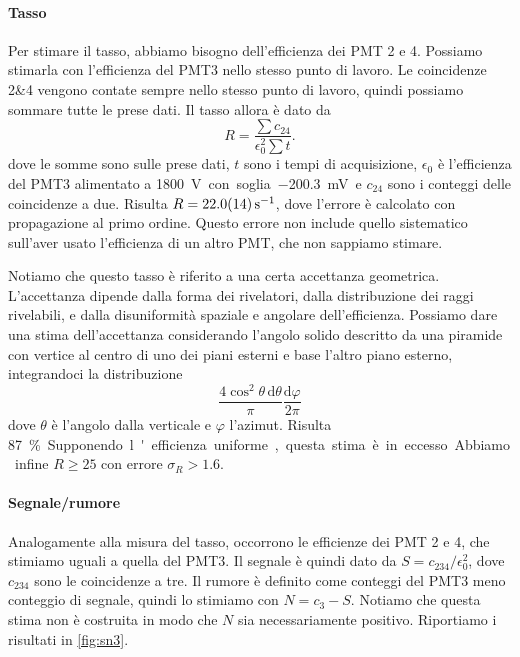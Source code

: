 \documentclass[a4paper]{article}
\newcommand*\de{\mathrm{d}}
\begin{document}
\paragraph{Tasso}

Per stimare il tasso, abbiamo bisogno dell'efficienza dei PMT 2 e 4.
Possiamo stimarla con l'efficienza del PMT3 nello stesso punto di lavoro.
Le coincidenze 2\&4 vengono contate sempre nello stesso punto di lavoro,
quindi possiamo sommare tutte le prese dati.
Il tasso allora è dato da
\begin{equation*}
	R = \frac{\sum c_{24}}{\epsilon_0^2 \sum t}.
\end{equation*}
dove le somme sono sulle prese dati,
$t$ sono i tempi di acquisizione,
$\epsilon_0$ è l'efficienza del PMT3 alimentato a \SI{1800}V con soglia \SI{-200.3}{mV}
e $c_{24}$ sono i conteggi delle coincidenze a due.
Risulta $R=\SI{22.0 \pm 1.4}{s^{-1}}$,
dove l'errore è calcolato con propagazione al primo ordine.
Questo errore non include quello sistematico sull'aver usato l'efficienza di un altro PMT,
che non sappiamo stimare.

Notiamo che questo tasso è riferito a una certa accettanza geometrica.
L'accettanza dipende dalla forma dei rivelatori,
dalla distribuzione dei raggi rivelabili,
e dalla disuniformità spaziale e angolare dell'efficienza.
Possiamo dare una stima dell'accettanza considerando l'angolo solido
descritto da una piramide con vertice al centro di uno dei piani esterni e base l'altro piano esterno,
integrandoci la distribuzione
\[\frac{4\cos^2\theta\,\de\theta}{\pi}\frac{\de\varphi}{2\pi}\]
dove $\theta$ è l'angolo dalla verticale e $\varphi$ l'azimut.
Risulta \SI{87}\%.
Supponendo l'efficienza uniforme,
questa stima è in eccesso.
Abbiamo infine
$R \ge 25$ con errore $\sigma_R>1.6$.

\paragraph{Segnale/rumore}

Analogamente alla misura del tasso,
occorrono le efficienze dei PMT 2 e 4,
che stimiamo uguali a quella del PMT3.
Il segnale è quindi dato da
$S=c_{234}/\epsilon_0^2$,
dove $c_{234}$ sono le coincidenze a tre.
Il rumore è definito come conteggi del PMT3 meno conteggio di segnale,
quindi lo stimiamo con $N=c_3-S$.
Notiamo che questa stima non è costruita in modo che $N$ sia necessariamente positivo.
Riportiamo i risultati in \autoref{fig:sn3}.
\end{document}
